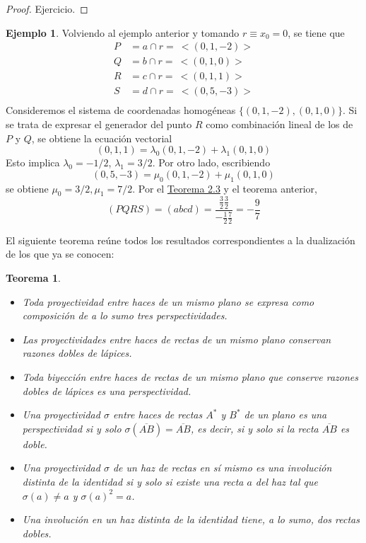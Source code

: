 \documentclass[12pt]{report}
\newtheorem{theorem}{Teorema}[chapter]
\theoremstyle{definition}
\theoremstyle{definition}
\newtheorem{example}{Ejemplo}[chapter]
\theoremstyle{remark}
\begin{document}
\begin{proof}
Ejercicio.
\end{proof}

\begin{example}
Volviendo al ejemplo anterior y tomando $r \equiv x_0 = 0$, se tiene que
\[
\begin{aligned}
P &= a \cap r = \ <(0,1,-2)>\\
Q &= b \cap r = \ <(0,1,0)>\\
R &= c \cap r = \ <(0,1,1)>\\
S &= d \cap r = \ <(0,5,-3)>\\
\end{aligned}
\]
Consideremos el sistema de coordenadas homogéneas $\{(0,1,-2),(0,1,0)\}$. Si se trata de expresar el generador del punto $R$ como combinación lineal de los de $P$ y $Q$, se obtiene la ecuación vectorial
\[(0,1,1) = \lambda_0(0,1,-2)+\lambda_1(0,1,0)\]
Esto implica $\lambda_0 = -1/2$, $\lambda_1 = 3/2$. Por otro lado, escribiendo
\[(0,5,-3) = \mu_0(0,1,-2)+\mu_1(0,1,0)\]
se obtiene $\mu_0 = 3/2, \mu_1 = 7/2$. Por el \hyperref[teo2.3.]{\color{blue}Teorema 2.3} y el teorema anterior,
\[(PQRS) = (abcd) = \frac{\frac{3}{2}\frac{3}{2}}{-\frac{1}{2}\frac{7}{2}} = -\frac{9}{7}\]
\end{example}

El siguiente teorema reúne todos los resultados correspondientes a la dualización de los que ya se conocen:

\pagebreak

\begin{theorem}
\hfill
\begin{itemize}
    \item[(i)] Toda proyectividad entre haces de un mismo plano se expresa como composición de a lo sumo tres perspectividades.
    \item[(ii)] Las proyectividades entre haces de rectas de un mismo plano conservan razones dobles de lápices.
    \item[(iii)] Toda biyección entre haces de rectas de un mismo plano que conserve razones dobles de lápices es una perspectividad.
    \item[(iv)] Una proyectividad $\sigma$ entre haces de rectas $A^*$ y $B^*$ de un plano es una perspectividad si y solo $\sigma(\overline{AB}) = \overline{AB}$, es decir, si y solo si la recta $\overline{AB}$ es doble.
    \item[(v)] Una proyectividad $\sigma$ de un haz de rectas en sí mismo es una involución distinta de la identidad si y solo si existe una recta $a$ del haz tal que $\sigma(a) \neq a$ y $\sigma(a)^2 = a$.
    \item[(vi)] Una involución en un haz distinta de la identidad tiene, a lo sumo, dos rectas dobles.
\end{itemize}
\end{theorem}
\end{document}
